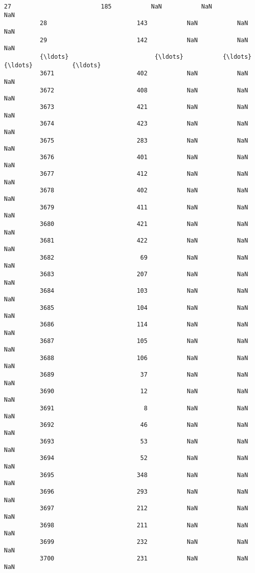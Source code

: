 \documentclass[11pt]{article}
\begin{document}
\begin{Verbatim}[commandchars=\\\{\}]
          27                         185           NaN           NaN           NaN   
          28                         143           NaN           NaN           NaN   
          29                         142           NaN           NaN           NaN   
          {\ldots}                        {\ldots}           {\ldots}           {\ldots}           {\ldots}   
          3671                       402           NaN           NaN           NaN   
          3672                       408           NaN           NaN           NaN   
          3673                       421           NaN           NaN           NaN   
          3674                       423           NaN           NaN           NaN   
          3675                       283           NaN           NaN           NaN   
          3676                       401           NaN           NaN           NaN   
          3677                       412           NaN           NaN           NaN   
          3678                       402           NaN           NaN           NaN   
          3679                       411           NaN           NaN           NaN   
          3680                       421           NaN           NaN           NaN   
          3681                       422           NaN           NaN           NaN   
          3682                        69           NaN           NaN           NaN   
          3683                       207           NaN           NaN           NaN   
          3684                       103           NaN           NaN           NaN   
          3685                       104           NaN           NaN           NaN   
          3686                       114           NaN           NaN           NaN   
          3687                       105           NaN           NaN           NaN   
          3688                       106           NaN           NaN           NaN   
          3689                        37           NaN           NaN           NaN   
          3690                        12           NaN           NaN           NaN   
          3691                         8           NaN           NaN           NaN   
          3692                        46           NaN           NaN           NaN   
          3693                        53           NaN           NaN           NaN   
          3694                        52           NaN           NaN           NaN   
          3695                       348           NaN           NaN           NaN   
          3696                       293           NaN           NaN           NaN   
          3697                       212           NaN           NaN           NaN   
          3698                       211           NaN           NaN           NaN   
          3699                       232           NaN           NaN           NaN   
          3700                       231           NaN           NaN           NaN   
          

\end{Verbatim}
\end{document}
